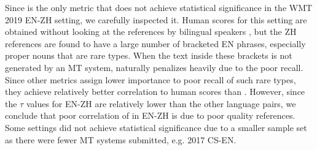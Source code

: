 Since  is the only metric that does not achieve statistical significance in the WMT 2019 EN-ZH setting, we carefully inspected it.
Human scores for this setting are obtained without looking at the references by bilingual speakers \cite{WMT19-metrics-proceedings}, but the ZH references are found to have a large number of bracketed EN phrases, especially proper nouns that are rare types.
When the text inside these brackets is not generated by an MT system,  naturally penalizes heavily due to the poor recall.
Since other metrics assign lower importance to poor recall of such rare types, they achieve relatively better correlation to human scores than . 
However, since the $\tau$ values for EN-ZH are relatively lower than the other language pairs, we conclude that poor correlation of  in EN-ZH is due to poor quality references.
Some settings did not achieve statistical significance due to a smaller sample set as there were fewer MT systems submitted, e.g. 2017 CS-EN.

